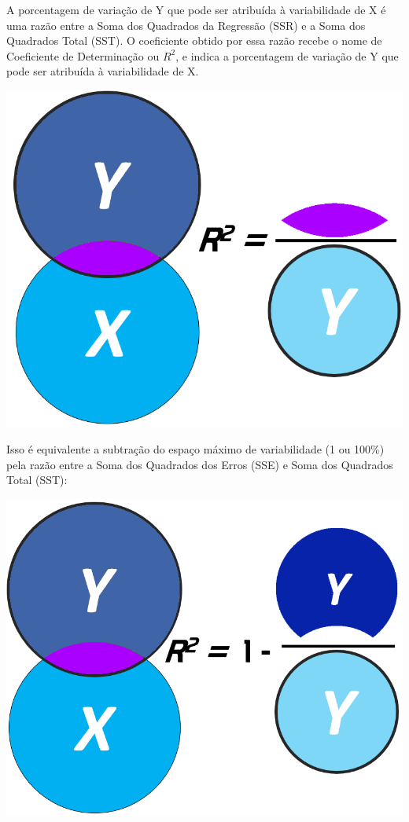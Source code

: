 \documentclass[
]{book}
\begin{document}
A porcentagem de variação de Y que pode ser atribuída à variabilidade de X é uma razão entre a Soma dos Quadrados da Regressão (SSR) e a Soma dos Quadrados Total (SST). O coeficiente obtido por essa razão recebe o nome de Coeficiente de Determinação ou \(R^2\), e indica a porcentagem de variação de Y que pode ser atribuída à variabilidade de X.

\includegraphics{./img/cap_regr2.png}

Isso é equivalente a subtração do espaço máximo de variabilidade (1 ou 100\%) pela razão entre a Soma dos Quadrados dos Erros (SSE) e Soma dos Quadrados Total (SST):

\includegraphics{./img/cap_reg_r21.png}
\end{document}
